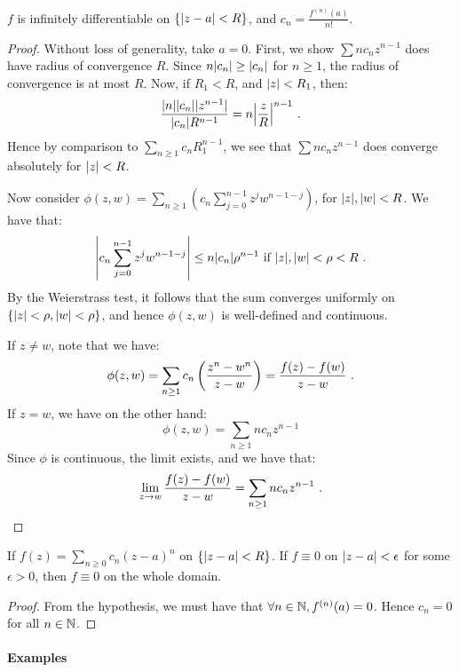 \begin{corollary}
  $f$ is infinitely differentiable on $\{ \abs{z - a} < R \}$, and $c_n = \frac{f^{(n)}(a)}{n!}$.
\end{corollary}

\begin{proof}
  Without loss of generality, take $a = 0$. First, we show $\sum n c_n z^{n-1}$ does have radius of convergence $R$. Since $n\abs{c_n} \geq \abs{c_n}$ for $n \geq 1$, the radius of convergence is at most $R$. Now, if $R_1 < R$, and $\abs{z} < R_1$, then:
\[
\frac{\abs{n}\abs{c_n}\abs{z^{n-1}}}{\abs{c_n}R^{n-1}} = n \abs*{\frac{z}{R}}^{n-1} \mpunct{.}
\]
Hence by comparison to $\sum_{n \geq 1} c_n R_1^{n-1}$, we see that $\sum n c_n z^{n-1}$ does converge absolutely for $\abs{z} < R$.

Now consider $\phi(z, w) = \sum_{n \geq 1} \left( c_n \sum_{j = 0}^{n-1} z^jw^{n-1-j} \right)$, for $\abs{z}, \abs{w} < R$. We have that:
\[
 \abs*{c_n \sum_{j = 0}^{n-1} z^j w^{n-1-j}} \leq n \abs{c_n}\rho^{n-1} \text{ if } \abs{z}, \abs{w} < \rho < R \mpunct{.}
\]
By the Weierstrass test, it follows that the sum converges uniformly on $\{ \abs{z} < \rho, \abs{w} < \rho \}$, and hence $\phi(z, w)$ is well-defined and continuous.

If $z \neq w$, note that we have:
\[
\phi(z, w) = \sum_{n \geq 1} c_n \left(\frac{z^n - w^n}{z - w}\right) = \frac{f(z) - f(w)}{z - w} \mpunct {.}
\]
If $z = w$, we have on the other hand:
\[
\phi(z, w) = \sum_{n \geq 1} nc_nz^{n-1}
\]
Since $\phi$ is continuous, the limit exists, and we have that:
\[
\lim_{z \rightarrow w} \frac{f(z) - f(w)}{z - w} = \sum_{n \geq 1} n c_n z^{n-1} \mpunct{.}
\]
\end{proof}

\begin{corollary}
  If  $f(z) = \sum_{n \geq 0} c_n (z - a)^n$ on $\{ \abs{ z - a } < R \}$. If $f \equiv 0$ on $\abs{z - a} < \epsilon$ for some $\epsilon > 0$, then $f \equiv 0$ on the whole domain.
\end{corollary}

\begin{proof}
  From the hypothesis, we must have that $\forall n \in \NN, f^{(n)} (a) = 0$. Hence $c_n = 0$ for all $n \in \NN$.
\end{proof}

\paragraph{Examples}


